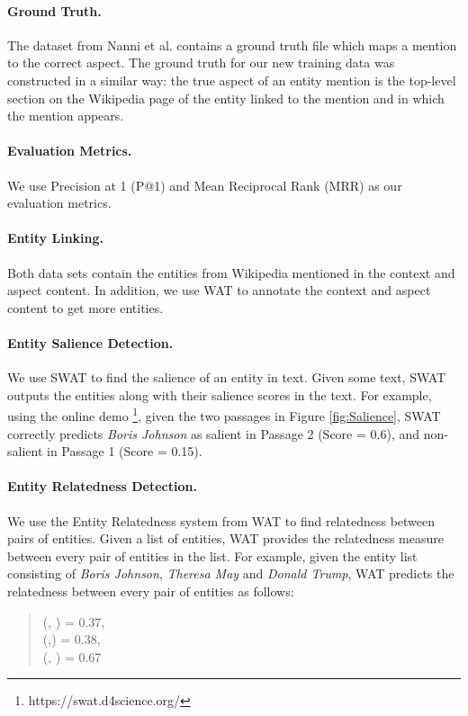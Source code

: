 \paragraph{\textbf{Ground Truth.}} The dataset from Nanni et al. \cite{nanni2018entity} contains a ground truth file which maps a mention to the correct aspect. %
The ground truth for our new training data was constructed in a similar way: the true aspect of an entity mention is the top-level section on the Wikipedia page of the entity linked to the mention and in which the mention appears.

\paragraph{\textbf{Evaluation Metrics.}} We use Precision at 1 (P@1) and Mean Reciprocal Rank (MRR) as our evaluation metrics.

\paragraph{\textbf{Entity Linking.}} Both data sets contain the entities from Wikipedia mentioned in the context and aspect content. In addition, we use WAT \cite{piccinno2014wat} to annotate the context and aspect content to get more entities. 

\paragraph{\textbf{Entity Salience Detection.}} We use SWAT \cite{swat}  to find the salience of an entity in text. Given some text, SWAT outputs the entities along with their salience scores in the text. For example, using the online demo \footnote{https://swat.d4science.org/}, given the two passages in Figure \ref{fig:Salience}, SWAT correctly predicts \textit{Boris Johnson} as salient in Passage 2 (Score = 0.6), and non-salient in Passage 1 (Score = 0.15). 

\paragraph{\textbf{Entity Relatedness Detection.}} We use the Entity Relatedness system from WAT \cite{piccinno2014wat} to find relatedness between pairs of entities. Given a list of entities, WAT provides the relatedness measure between every pair of entities in the list. For example, given the entity list consisting of \textit{Boris Johnson}, \textit{Theresa May} and \textit{Donald Trump}, WAT predicts the relatedness between every pair of entities as follows:
\begin{quote}
    (, ) = 0.37, \\
    (,)    = 0.38, \\
    (, )  = 0.67
\end{quote}

